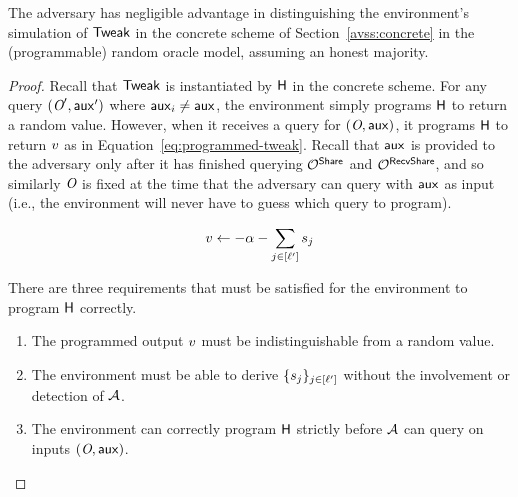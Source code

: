 \begin{lemma} \label{lem:avss-programtweak}
  The adversary has negligible advantage in distinguishing the environment's simulation of $\mathsf{Tweak}$ in the concrete scheme of Section~\ref{avss:concrete} in the (programmable) random oracle model, assuming an honest majority.
\end{lemma}


\begin{proof}
  Recall that $\mathsf{Tweak}$ is instantiated by $\mathsf{H}$ in the concrete scheme.
  For any query $(\textit{O}', \mathsf{aux}' )$ where $\mathsf{aux}_i \neq \mathsf{aux}$,
  the environment simply programs $\mathsf{H}$ to return a random value.
  However, when it receives a query for $(\textit{O}, \mathsf{aux})$,
  it programs $\mathsf{H}$ to return $v$ as in Equation~\ref{eq:programmed-tweak}.
  Recall that $\mathsf{aux}$ is provided to the adversary only after it has finished querying $\mathcal{O}^{\mathsf{Share}}$ and $\mathcal{O}^{\mathsf{RecvShare}}$,
  and so similarly $\textit{O}$ is fixed at the time that the adversary can query with $\mathsf{aux}$ as input
  (i.e., the environment will never have to guess which query to program).

  \begin{equation} \label{eq:programmed-tweak}
   v \gets -\alpha - \sum_{j \in [{\mathsf{\ell}'}]} s_j \\
  \end{equation}

  There are three requirements that must be satisfied for the environment to program $\mathsf{H}$ correctly.
  \begin{enumerate}
    \item The programmed output $v$ must be indistinguishable from a random value.
    \item The environment must be able to derive $\{ s_j \}_{ j \in [{\mathsf{\ell}'}]}$ without the involvement or detection of $\mathcal{A}$.
    \item The environment can correctly program $\mathsf{H}$ strictly before $\mathcal{A}$ can query on inputs $(\textit{O}, \mathsf{aux})$.
  \end{enumerate}


\end{proof}
